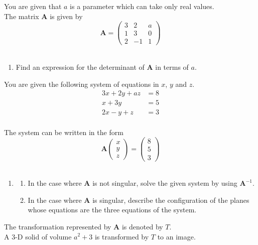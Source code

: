 \documentclass[leqno]{article}
\begin{document}
\begin{enumerate}[
  label=\textbf{\arabic*.},
  leftmargin=*,
  topsep=0pt,
  partopsep=0pt,
  parsep=0pt
]
You are given that $a$ is a parameter which can take only real values. \\
The matrix $\mathbf{A}$ is given by
\[
\mathbf{A}=\begin{pmatrix}
3&2&a\\
1&3&0\\
2&-1&1
\end{pmatrix}
\] \\
\begin{enumerate}[label=\textbf{(\alph*)}]
  \item Find an expression for the determinant of $\mathbf{A}$ in terms of $a$.  \\
\end{enumerate}
You are given the following system of equations in $x$, $y$ and $z$.
\[
\begin{aligned}
3x+2y+az&=8\\
x+3y&=5\\
2x-y+z&=3
\end{aligned}
\] \\
The system can be written in the form
\[
\mathbf{A}\begin{pmatrix}x\\ y\\ z\end{pmatrix}=\begin{pmatrix}8\\5\\3\end{pmatrix}
\] \\
\begin{enumerate}[label=\textbf{(\alph*)}, resume]
  \item
  \begin{enumerate}[label=(\roman*)]
    \item In the case where $\mathbf{A}$ is not singular, solve the given system by using $\mathbf{A}^{-1}$. 
    \item In the case where $\mathbf{A}$ is singular, describe the configuration of the planes whose equations are the three equations of the system.  \\
  \end{enumerate}
\end{enumerate}
The transformation represented by $\mathbf{A}$ is denoted by $T$. \\
A 3-D solid of volume $a^2+3$ is transformed by $T$ to an image. \\
\begin{enumerate}[label=\textbf{(\alph*)}, resume]

\end{enumerate}
\end{enumerate}
\end{document}
